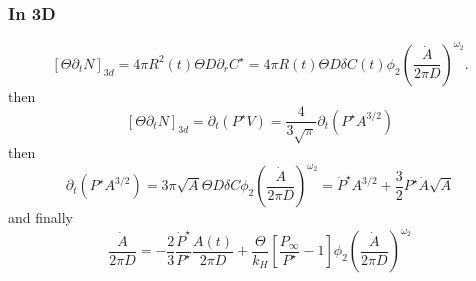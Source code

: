 \documentclass[11pt]{revtex4}
\begin{document}
\subsubsection{In 3D}
\begin{equation}
	\label{eq:xch3d}
	\left\lbrack \Theta \partial_t N\right\rbrack_{3d} =  4\pi R^2(t) \Theta D  \partial_r C^\star = 4\pi R(t) \Theta D  \delta C(t) \phi_2 \left(\dfrac{\dot{A}}{2\pi D}\right)^{\omega_2}.
\end{equation}
then
\begin{equation}
	\left\lbrack \Theta \partial_t N\right\rbrack_{3d} = \partial_t\left(P^\star V\right) = \dfrac{4}{3\sqrt{\pi}} \partial_t \left( P^\star A^{3/2}\right)
\end{equation}
then
\begin{equation}
	\partial_t \left( P^\star A^{3/2}\right) = 3\pi \sqrt{A} \Theta D \delta C  \phi_2 \left(\dfrac{\dot{A}}{2\pi D}\right)^{\omega_2} =
	\dot{P}^\star A^{3/2} + \dfrac{3}{2} P^\star \dot{A} \sqrt{A}
\end{equation}
and finally
\begin{equation}
	\dfrac{\dot{A}}{2\pi D} = -\dfrac{2}{3} \dfrac{\dot{P}^\star}{P^\star} \dfrac{A(t)}{2\pi D} + \dfrac{\Theta}{k_H}  \left[\dfrac{P_\infty}{P^\star}-1\right] \phi_2 \left(\dfrac{\dot{A}}{2\pi D}\right)^{\omega_2}
\end{equation}
\end{document}
